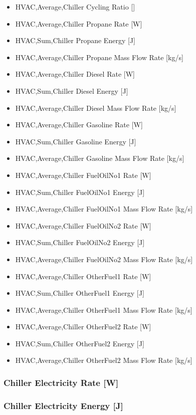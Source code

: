\begin{itemize}
\item
  HVAC,Average,Chiller Cycling Ratio {[]}
\item
  HVAC,Average,Chiller Propane Rate {[}W{]}
\item
  HVAC,Sum,Chiller Propane Energy {[}J{]}
\item
  HVAC,Average,Chiller Propane Mass Flow Rate {[}kg/s{]}
\item
  HVAC,Average,Chiller Diesel Rate {[}W{]}
\item
  HVAC,Sum,Chiller Diesel Energy {[}J{]}
\item
  HVAC,Average,Chiller Diesel Mass Flow Rate {[}kg/s{]}
\item
  HVAC,Average,Chiller Gasoline Rate {[}W{]}
\item
  HVAC,Sum,Chiller Gasoline Energy {[}J{]}
\item
  HVAC,Average,Chiller Gasoline Mass Flow Rate {[}kg/s{]}
\item
  HVAC,Average,Chiller FuelOilNo1 Rate {[}W{]}
\item
  HVAC,Sum,Chiller FuelOilNo1 Energy {[}J{]}
\item
  HVAC,Average,Chiller FuelOilNo1 Mass Flow Rate {[}kg/s{]}
\item
  HVAC,Average,Chiller FuelOilNo2 Rate {[}W{]}
\item
  HVAC,Sum,Chiller FuelOilNo2 Energy {[}J{]}
\item
  HVAC,Average,Chiller FuelOilNo2 Mass Flow Rate {[}kg/s{]}
\item
  HVAC,Average,Chiller OtherFuel1 Rate {[}W{]}
\item
  HVAC,Sum,Chiller OtherFuel1 Energy {[}J{]}
\item
  HVAC,Average,Chiller OtherFuel1 Mass Flow Rate {[}kg/s{]}
\item
  HVAC,Average,Chiller OtherFuel2 Rate {[}W{]}
\item
  HVAC,Sum,Chiller OtherFuel2 Energy {[}J{]}
\item
  HVAC,Average,Chiller OtherFuel2 Mass Flow Rate {[}kg/s{]}
\end{itemize}

\subsubsection{Chiller Electricity Rate {[}W{]}}\label{chiller-electric-power-w}

\subsubsection{Chiller Electricity Energy {[}J{]}}\label{chiller-electric-energy-j}

